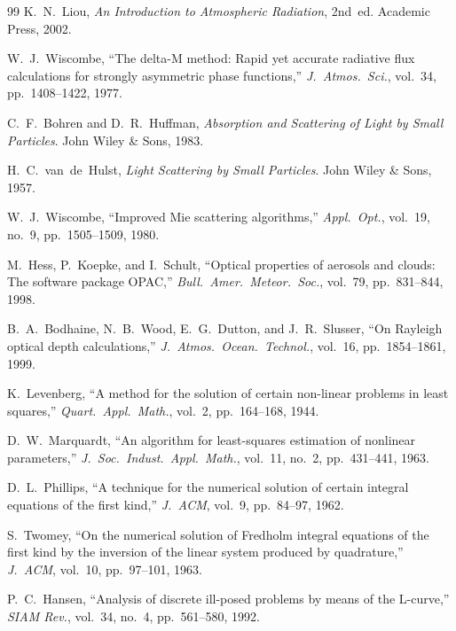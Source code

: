 \documentclass[a4paper, 11pt]{article}
\begin{document}
\begin{thebibliography}{99}
    K.~N.~Liou,
    \textit{An Introduction to Atmospheric Radiation}, 2nd~ed.
    Academic Press, 2002.

    W.~J.~Wiscombe,
    ``The delta-M method: Rapid yet accurate radiative flux calculations
    for strongly asymmetric phase functions,''
    \textit{J.\ Atmos.\ Sci.}, vol.~34, pp.~1408--1422, 1977.

    C.~F.~Bohren and D.~R.~Huffman,
    \textit{Absorption and Scattering of Light by Small Particles}.
    John Wiley \& Sons, 1983.

    H.~C.~van~de~Hulst,
    \textit{Light Scattering by Small Particles}.
    John Wiley \& Sons, 1957.

    W.~J.~Wiscombe,
    ``Improved Mie scattering algorithms,''
    \textit{Appl.\ Opt.}, vol.~19, no.~9, pp.~1505--1509, 1980.

    M.~Hess, P.~Koepke, and I.~Schult,
    ``Optical properties of aerosols and clouds: The software package
    OPAC,''
    \textit{Bull.\ Amer.\ Meteor.\ Soc.}, vol.~79, pp.~831--844, 1998.

    B.~A.~Bodhaine, N.~B.~Wood, E.~G.~Dutton, and J.~R.~Slusser,
    ``On Rayleigh optical depth calculations,''
    \textit{J.\ Atmos.\ Ocean.\ Technol.}, vol.~16, pp.~1854--1861, 1999.

    K.~Levenberg,
    ``A method for the solution of certain non-linear problems in least
    squares,''
    \textit{Quart.\ Appl.\ Math.}, vol.~2, pp.~164--168, 1944.

    D.~W.~Marquardt,
    ``An algorithm for least-squares estimation of nonlinear parameters,''
    \textit{J.\ Soc.\ Indust.\ Appl.\ Math.}, vol.~11, no.~2,
    pp.~431--441, 1963.

    D.~L.~Phillips,
    ``A technique for the numerical solution of certain integral
    equations of the first kind,''
    \textit{J.\ ACM}, vol.~9, pp.~84--97, 1962.

    S.~Twomey,
    ``On the numerical solution of Fredholm integral equations of the
    first kind by the inversion of the linear system produced by
    quadrature,''
    \textit{J.\ ACM}, vol.~10, pp.~97--101, 1963.

    P.~C.~Hansen,
    ``Analysis of discrete ill-posed problems by means of the L-curve,''
    \textit{SIAM Rev.}, vol.~34, no.~4, pp.~561--580, 1992.


\end{thebibliography}
\end{document}
